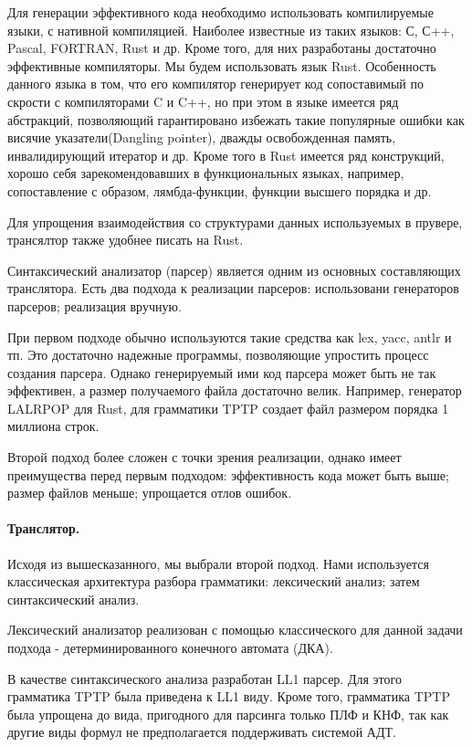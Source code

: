 \documentclass[a4paper]{jctart15b}
\begin{document}
Для генерации эффективного кода необходимо использовать компилируемые языки, с нативной компиляцией. Наиболее известные из таких языков: С, С++, Pascal, FORTRAN, Rust и др. Кроме того, для них разработаны достаточно эффективные компиляторы. Мы будем использовать язык Rust. Особенность данного языка в том, что его компилятор генерирует код сопоставимый по скрости с компиляторами C и C++, но при этом в языке имеется ряд абстракций, позволяющий гарантировано избежать такие популярные ошибки как висячие указатели(Dangling pointer), дважды освобожденная память, инвалидирующий итератор и др. Кроме того в Rust имеется ряд конструкций, хорошо себя зарекомендовавших в функциональных языках, например, сопоставление с образом, лямбда-функции, функции высшего порядка и др.

Для упрощения взаимодействия со структурами данных используемых в прувере, трансялтор также удобнее писать на Rust.

Синтаксический анализатор (парсер) является одним из основных составляющих транслятора. Есть два подхода к реализации парсеров: использовани генераторов парсеров; реализация вручную.

При первом подходе обычно используются такие средства как lex, yacc, antlr и тп. Это достаточно надежные программы, позволяющие упростить процесс создания парсера. Однако генерируемый ими код парсера может быть не так эффективен, а размер получаемого файла достаточно велик. Например, генератор LALRPOP для Rust, для грамматики TPTP создает файл размером порядка 1 миллиона строк.

Второй подход более сложен с точки зрения реализации, однако имеет преимущества перед первым подходом: эффективность кода может быть выше; размер файлов меньше; упрощается отлов ошибок.

\paragraph{Транслятор.}
Исходя из вышесказанного, мы выбрали второй подход. Нами используется классическая архитектура разбора грамматики: лексический анализ; затем синтаксический анализ. 

Лексический анализатор реализован с помощью классического для данной задачи подхода - детерминированного конечного автомата (ДКА).

В качестве синтаксического анализа разработан LL1 парсер. Для этого грамматика TPTP была приведена к LL1 виду. Кроме того, грамматика TPTP была упрощена до вида, пригодного для парсинга только ПЛФ и КНФ, так как другие виды формул не предполагается поддерживать системой АДТ.
\end{document}
